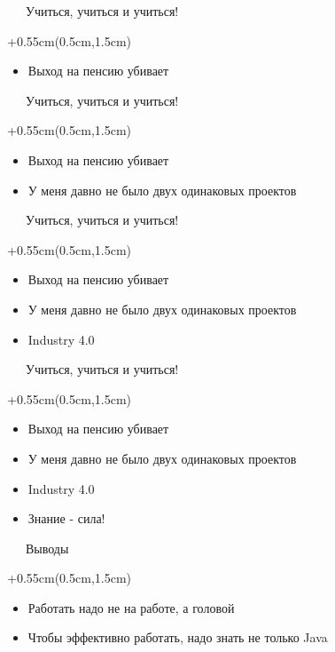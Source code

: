 \documentclass[xetex,18pt,aspectratio=169]{beamer}
\begin{document}
\begin{Large}
\begin{frame}{\ \ \ Учиться, учиться и учиться!}
\begin{textblock*}{\framewidth+0.55cm}(0.5cm,1.5cm)
\begin{itemize}
  \item Выход на пенсию убивает
\end{itemize}
\end{textblock*}
\end{frame}

\begin{frame}{\ \ \ Учиться, учиться и учиться!}
\begin{textblock*}{\framewidth+0.55cm}(0.5cm,1.5cm)
\begin{itemize}
  \item Выход на пенсию убивает
  \item У меня давно не было двух одинаковых проектов
\end{itemize}
\end{textblock*}
\end{frame}

\begin{frame}{\ \ \ Учиться, учиться и учиться!}
\begin{textblock*}{\framewidth+0.55cm}(0.5cm,1.5cm)
\begin{itemize}
  \item Выход на пенсию убивает
  \item У меня давно не было двух одинаковых проектов
  \item Industry 4.0
\end{itemize}
\end{textblock*}
\end{frame}

\begin{frame}{\ \ \ Учиться, учиться и учиться!}
\begin{textblock*}{\framewidth+0.55cm}(0.5cm,1.5cm)
\begin{itemize}
  \item Выход на пенсию убивает
  \item У меня давно не было двух одинаковых проектов
  \item Industry 4.0
  \item Знание - сила!
\end{itemize}
\end{textblock*}
\end{frame}

\begin{frame}{\ \ \ Выводы}
\begin{textblock*}{\framewidth+0.55cm}(0.5cm,1.5cm)
\begin{itemize}
  \item Работать надо не на работе, а головой
  \item Чтобы эффективно работать, надо знать не только Java
\end{itemize}
\end{textblock*}
\end{frame}


\end{Large}
\end{document}
